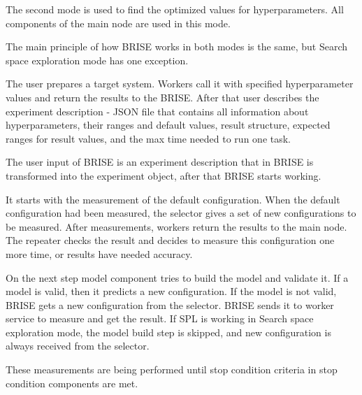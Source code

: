 The second mode is used to find the optimized values for hyperparameters. All components of the main node are used in this mode.

The main principle of how BRISE works in both modes is the same, but 
Search space exploration mode has one exception.

The user prepares a target system. Workers call it with specified hyperparameter values and return the results to the BRISE.
After that user describes the experiment description - JSON file that contains all information about hyperparameters, their ranges and default values, result structure, expected ranges for result values, and the max time needed to run one task.

The user input of BRISE is an experiment description that in BRISE is transformed into the experiment object, after that BRISE starts working.

It starts with the measurement of the default configuration. When the default configuration had been measured, the selector gives a set of new configurations to be measured. After measurements, workers return the results to the main node. The repeater checks the result and decides to measure this configuration one more time, or results have needed accuracy. 

On the next step model component tries to build the model and validate it. If a model is valid, then it predicts a new configuration. If the model is not valid, BRISE gets a new configuration from the selector. BRISE sends it to worker service to measure and get the result. If SPL is working in Search space exploration mode, the model build step is skipped, and new configuration is always received from the selector. 

These measurements are being performed until stop condition criteria in stop condition components are met.
